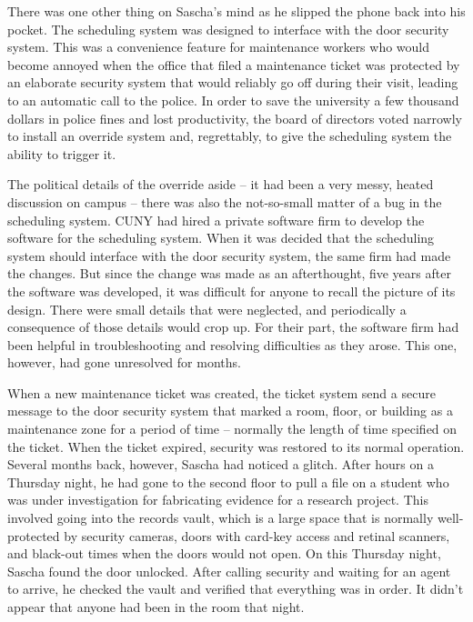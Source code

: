 There was one other thing on Sascha's mind as he slipped the phone back into his pocket.  The scheduling system was designed to interface with the door security system.  This was a convenience feature for maintenance workers who would become annoyed when the office that filed a maintenance ticket was protected by an elaborate security system that would reliably go off during their visit, leading to an automatic call to the police.  In order to save the university a few thousand dollars in police fines and lost productivity, the board of directors voted narrowly to install an override system and, regrettably, to give the scheduling system the ability to trigger it.

The political details of the override aside -- it had been a very messy, heated discussion on campus -- there was also the not-so-small matter of a bug in the scheduling system.  CUNY had hired a private software firm to develop the software for the scheduling system.  When it was decided that the scheduling system should interface with the door security system, the same firm had made the changes.  But since the change was made as an afterthought, five years after the software was developed, it was difficult for anyone to recall the picture of its design.  There were small details that were neglected, and periodically a consequence of those details would crop up.  For their part, the software firm had been helpful in troubleshooting and resolving difficulties as they arose.  This one, however, had gone unresolved for months.

When a new maintenance ticket was created, the ticket system send a secure message to the door security system that marked a room, floor, or building as a maintenance zone for a period of time -- normally the length of time specified on the ticket.  When the ticket expired, security was restored to its normal operation.  Several months back, however, Sascha had noticed a glitch.  After hours on a Thursday night, he had gone to the second floor to pull a file on a student who was under investigation for fabricating evidence for a research project.  This involved going into the records vault, which is a large space that is normally well-protected by security cameras, doors with card-key access and retinal scanners, and black-out times when the doors would not open.  On this Thursday night, Sascha found the door unlocked.  After calling security and waiting for an agent to arrive, he checked the vault and verified that everything was in order.  It didn't appear that anyone had been in the room that night.

